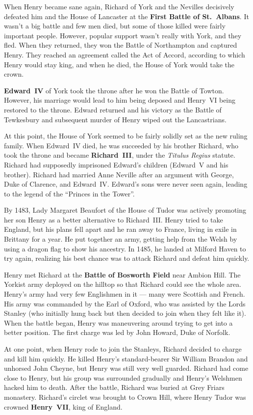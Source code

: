 When Henry became sane again, Richard of York and the Nevilles decisively defeated
him and the House of Lancaster at the \textbf{First Battle of St.\ Albans}.
It wasn't a big battle and few men died, but some of those killed were fairly important people.
However, popular support wasn't really with York, and they fled.
When they returned, they won the Battle of Northampton and captured Henry.
They reached an agreement called the Act of Accord, according to which Henry would stay king,
and when he died, the House of York would take the crown.

\textbf{Edward~IV} of York took the throne after he won the Battle of Towton.
However, his marriage would lead to him being deposed and Henry~VI being restored to the throne.
Edward returned and his victory as the Battle of Tewkesbury
and subsequent murder of Henry wiped out the Lancastrians.

At this point, the House of York seemed to be fairly solidly set as the new ruling family.
When Edward~IV died, he was succeeded by his brother Richard,
who took the throne and became \textbf{Richard~III}, under the \textit{Titulus Regius} statute.
Richard had supposedly imprisoned Edward's children (Edward~V and his brother).
Richard had married Anne Neville after an argument with George, Duke of Clarence, and Edward~IV\@.
Edward's sons were never seen again, leading to the legend of the ``Princes in the Tower''.

By 1483, Lady Margaret Beaufort of the House of Tudor was actively promoting her son Henry
as a better alternative to Richard~III\@.
Henry tried to take England, but his plans fell apart and he ran away to France,
living in exile in Brittany for a year.
He put together an army, getting help from the Welsh by using a dragon flag to show his ancestry.
In 1485, he landed at Milford Haven to try again,
realizing his best chance was to attack Richard and defeat him quickly.

Henry met Richard at the \textbf{Battle of Bosworth Field} near Ambion Hill.
The Yorkist army deployed on the hilltop so that Richard could see the whole area.
Henry's army had very few Englishmen in it --- many were Scottish and French.
His army was commanded by the Earl of Oxford, who was assisted by the Lords Stanley
(who initially hung back but then decided to join when they felt like it).
When the battle began, Henry was maneuvering around trying to get into a better position.
The first charge was led by John Howard, Duke of Norfolk.

At one point, when Henry rode to join the Stanleys, Richard decided to charge and kill him quickly.
He killed Henry's standard-bearer Sir William Brandon and unhorsed John Cheyne,
but Henry was still very well guarded.
Richard had come close to Henry, but his group was surrounded gradually and Henry's Welshmen hacked him to death.
After the battle, Richard was buried at Grey Friars monastery.
Richard's circlet was brought to Crown Hill, where Henry Tudor was crowned \textbf{Henry~VII}, king of England.

